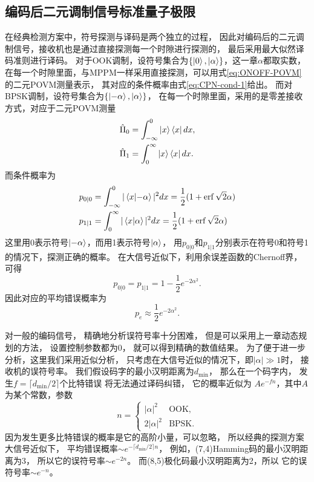 \subsection{编码后二元调制信号标准量子极限}
在经典检测方案中，符号探测与译码是两个独立的过程，
因此对编码后的二元调制信号，接收机也是通过直接探测每一个时隙进行探测的，
最后采用最大似然译码准则进行译码。
对于OOK调制，设符号集合为$\{\ket{0}, \ket{\alpha}\}$，这一章$\alpha$都取实数，
在每一个时隙里面，与MPPM一样采用直接探测，可以用式\ref{eq:ONOFF-POVM} 的二元POVM测量表示，
其对应的条件概率由式\ref{eq:CPN-cond-1}给出。
而对BPSK调制，设符号集合为$\{\ket{-\alpha}, \ket{\alpha}\}$，
在每一个时隙里面，采用的是零差接收方式，对应于二元POVM测量
\begin{equation}
\begin{split}
\hat{\Pi}_0 &= \int_{-\infty}^0 \ket{x}\bra{x} dx, \\
\hat{\Pi}_1 &= \int_0^{\infty} \ket{x}\bra{x} dx.
\end{split}
\end{equation}
而条件概率为
\begin{equation}
\begin{split}
p_{0|0} &= \int_{-\infty}^0 |\bra{x}\ket{-\alpha}|^2 dx = \frac{1}{2}(1+\erf{\sqrt{2}\alpha}) \\
p_{1|1} &= \int_0^{\infty} |\bra{x}\ket{\alpha}|^2 dx = \frac{1}{2}(1+\erf{\sqrt{2}\alpha}) 
\end{split}
\end{equation}
这里用0表示符号$\ket{-\alpha}$，而用1表示符号$\ket{\alpha}$，
用$p_{0|0}$和$p_{1|1}$分别表示在符号0和符号1的情况下，探测正确的概率。
在大信号近似下，利用余误差函数的Chernoff界\cite{chang2011chernoff}，可得
\begin{equation}
p_{0|0} = p_{1|1} = 1 - \frac{1}{2} e^{-2\alpha^2}.
\end{equation}
因此对应的平均错误概率为
\begin{equation}
p_e \approx \frac{1}{2} e^{-2\alpha^2}.
\end{equation}

对一般的编码信号，
精确地分析误符号率十分困难，
但是可以采用上一章动态规划的方法，
设置控制参数都为0，
就可以得到精确的数值结果。
为了便于进一步分析，这里我们采用近似分析，
只考虑在大信号近似的情况下，即$|\alpha| \gg 1$时，
接收机的误符号率。
我们假设码字的最小汉明距离为$d_{\min}$，
那么在一个码字内，
发生$f = \lceil d_{\min}/2 \rceil$个比特错误
将无法通过译码纠错，
它的概率近似为 $Ae^{-f n}$，其中$A$为某个常数，参数
\begin{equation}
n = \begin{cases}
        |\alpha|^2 & \text{OOK}, \\
        2|\alpha|^2 & \text{BPSK}.
    \end{cases}
\end{equation}
因为发生更多比特错误的概率是它的高阶小量，可以忽略，
所以经典的探测方案大信号近似下，
平均错误概率$\sim e^{-\lceil d_{\min}/2\rceil n}$，
例如，(7,4)Hamming码的最小汉明距离为3，
所以它的误符号率$\sim e^{-2n}$。
而(8,5)极化码最小汉明距离为2，所以
它的误符号率$\sim e^{-n}$。


